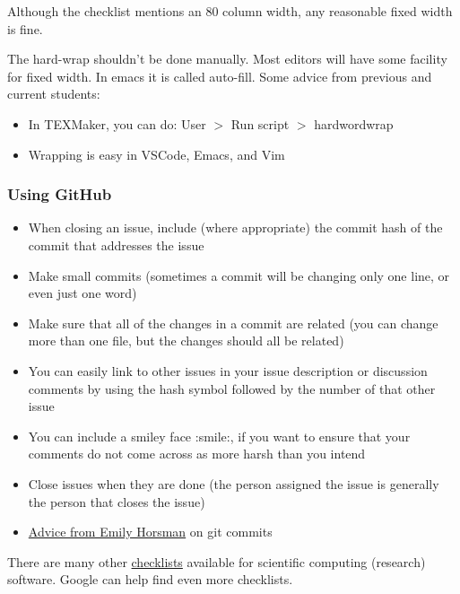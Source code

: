 \documentclass[12pt]{article}
\begin{document}
Although the checklist mentions an 80 column width, any reasonable fixed width is fine.

The hard-wrap shouldn't be done manually. Most editors will have some facility for fixed width. In
emacs it is called auto-fill. Some advice from previous and current students:

\begin{itemize}
	\item In TEXMaker, you can do: User $>$ Run script $>$ hardwordwrap
	\item Wrapping is easy in VSCode, Emacs, and Vim
\end{itemize}

\subsubsection*{Using GitHub}

\begin{itemize}
	\item When closing an issue, include (where appropriate) the commit hash of the commit that addresses the
	      issue
	\item Make small commits (sometimes a commit will be changing only one line, or even just one word)
	\item Make sure that all of the changes in a commit are related (you can change more than one file, but
	      the changes should all be related)
	\item You can easily link to other issues in your issue description or discussion comments by using the
	      hash symbol followed by the number of that other issue
	\item You can include a smiley face :smile:, if you want to ensure that your comments do not come across
	      as more harsh than you intend
	\item Close issues when they are done (the person assigned the issue is generally the person that closes
	      the issue) \item
	      \href{https://gitlab.cas.mcmaster.ca/smiths/se2aa4_cs2me3/-/blob/master/FAQ/GitAdvice.txt} {Advice
		      from Emily Horsman} on git commits
\end{itemize}

There are many other
\href{https://gitlab.cas.mcmaster.ca/SEforSC/se4sc/-/wikis/Advice-and-Checklists-for-Repos-(including-a-list-of-recommended-artifacts)}{checklists}
available for scientific computing (research) software. Google can help find even more checklists.
\end{document}
